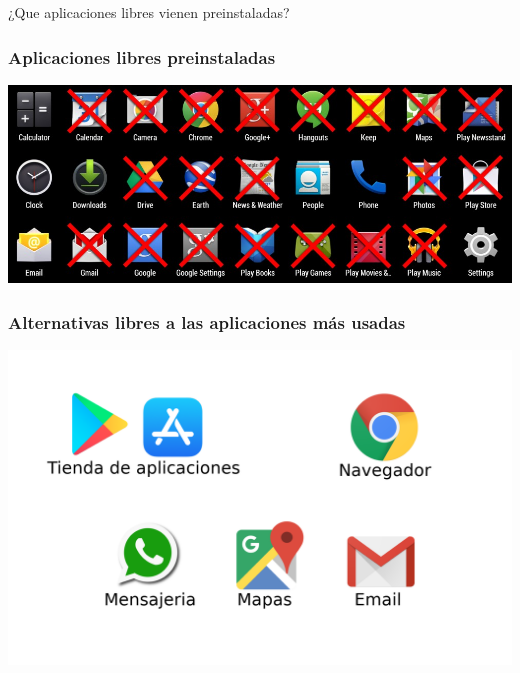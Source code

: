 \begin{frame}

    \centering
    \Huge{¿Que aplicaciones libres vienen preinstaladas?}

\end{frame}

\begin{frame}

    \frametitle{Aplicaciones libres preinstaladas}

    \includegraphics[width=\textwidth]{images/android-free-apps.jpg}

\end{frame}

\begin{frame}

    \frametitle{Alternativas libres a las aplicaciones más usadas}

    \includegraphics[width=\textwidth]{images/alternatives-title.png}

\end{frame}

